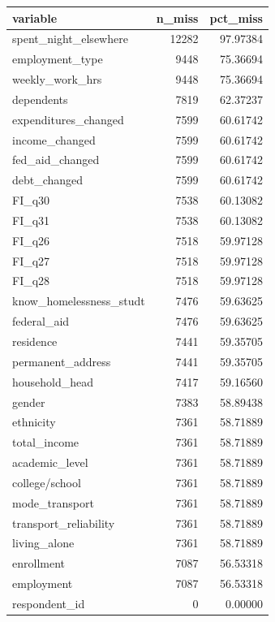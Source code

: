 \documentclass[
  10pt,
]{article}
\newenvironment{Shaded}{\begin{snugshade}}{\end{snugshade}}
\newcommand{\CommentTok}[1]{\textcolor[rgb]{0.56,0.35,0.01}{\textit{#1}}}
\newcommand{\KeywordTok}[1]{\textcolor[rgb]{0.13,0.29,0.53}{\textbf{#1}}}
\newcommand{\NormalTok}[1]{#1}
\newcommand{\OperatorTok}[1]{\textcolor[rgb]{0.81,0.36,0.00}{\textbf{#1}}}
\newcommand{\StringTok}[1]{\textcolor[rgb]{0.31,0.60,0.02}{#1}}
\begin{document}
\begin{Shaded}
\end{Shaded}

\begin{tabular}{l|r|r}
\hline
variable & n\_miss & pct\_miss\\
\hline
spent\_night\_elsewhere & 12282 & 97.97384\\
\hline
employment\_type & 9448 & 75.36694\\
\hline
weekly\_work\_hrs & 9448 & 75.36694\\
\hline
dependents & 7819 & 62.37237\\
\hline
expenditures\_changed & 7599 & 60.61742\\
\hline
income\_changed & 7599 & 60.61742\\
\hline
fed\_aid\_changed & 7599 & 60.61742\\
\hline
debt\_changed & 7599 & 60.61742\\
\hline
FI\_q30 & 7538 & 60.13082\\
\hline
FI\_q31 & 7538 & 60.13082\\
\hline
FI\_q26 & 7518 & 59.97128\\
\hline
FI\_q27 & 7518 & 59.97128\\
\hline
FI\_q28 & 7518 & 59.97128\\
\hline
know\_homelessness\_studt & 7476 & 59.63625\\
\hline
federal\_aid & 7476 & 59.63625\\
\hline
residence & 7441 & 59.35705\\
\hline
permanent\_address & 7441 & 59.35705\\
\hline
household\_head & 7417 & 59.16560\\
\hline
gender & 7383 & 58.89438\\
\hline
ethnicity & 7361 & 58.71889\\
\hline
total\_income & 7361 & 58.71889\\
\hline
academic\_level & 7361 & 58.71889\\
\hline
college/school & 7361 & 58.71889\\
\hline
mode\_transport & 7361 & 58.71889\\
\hline
transport\_reliability & 7361 & 58.71889\\
\hline
living\_alone & 7361 & 58.71889\\
\hline
enrollment & 7087 & 56.53318\\
\hline
employment & 7087 & 56.53318\\
\hline
respondent\_id & 0 & 0.00000\\
\hline
\end{tabular}
\end{document}
